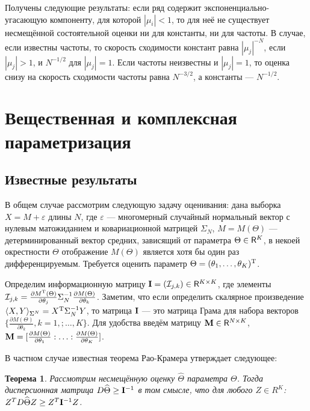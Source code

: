 \documentclass[12pt,a4paper]{article}
\newtheorem{theorem}{Теорема}
\begin{document}
Получены следующие результаты: если ряд содержит экспоненциально-угасающую компоненту, для которой $|\mu_i| < 1$, то для неё не существует несмещённой состоятельной оценки ни для константы, ни для частоты. В случае, если известны частоты, то скорость сходимости констант равна $|\mu_j|^{-N}$, если $|\mu_j|>1$, и $N^{-1/2}$ для $|\mu_j|=1$. Если частоты неизвестны и $|\mu_j|=1$, то оценка снизу на скорость сходимости частоты равна $N^{-3/2}$, а константы --- $N^{-1/2}$.

\section{Вещественная и комплексная параметризация}
\subsection{Известные результаты}
В общем случае рассмотрим следующую задачу оценивания: дана выборка $X = M + \varepsilon$ длины $N$, где $\varepsilon$ --- многомерный случайный нормальный вектор с нулевым матожиданием и ковариационной матрицей $\Sigma_N$, $M = M(\Theta)$ --- детерминированный вектор средних, зависящий от параметра $\Theta \in \mathsf{R}^K$, в некоей окрестности $\Theta$ отображение $M(\Theta)$ является хотя бы один раз дифференцируемым. Требуется оценить параметр $\Theta = (\theta_1, \ldots, \theta_K)^{\mathrm{T}}$.

Определим информационную матрицу $\mathbf{I} = (\mathcal{I}_{j, k}) \in \mathsf{R}^{K \times K}$, где элементы $\mathcal{I}_{j, k} = \frac{\partial M^{\mathrm{T}}(\Theta)}{\partial \theta_j} \Sigma_N^{-1} \frac{\partial M(\Theta)}{\partial \theta_k}$. Заметим, что если определить скалярное произведение $\langle X, Y \rangle_{\Sigma^N} = X^{\mathrm{T}} \Sigma_N^{-1} Y$, то матрица $\mathbf{I}$ --- это матрица Грама для набора векторов $ \{\frac{\partial M(\Theta)}{\partial \theta_k}, k = 1,; \ldots, K\}$. Для удобства введём матрицу $\mathbf{M} \in \mathsf{R}^{N \times K}$, $\mathbf{M} = [\frac{\partial M(\Theta)}{\partial \theta_1}:\ldots:\frac{\partial M(\Theta)}{\partial \theta_K}]$.

В частном случае известная теорема Рао-Крамера утверждает следующее:
\begin{theorem} \label{th:raokramer}
	Рассмотрим несмещённую оценку $\widehat \Theta$ параметра $\Theta$. Тогда дисперсионная матрица $D \widehat \Theta \ge \mathbf{I}^{-1}$ в том смысле, что для любого $Z \in R^K$: $Z^T D \widehat \Theta Z \ge Z^T \mathbf{I}^{-1} Z$.
\end{theorem}
\end{document}

